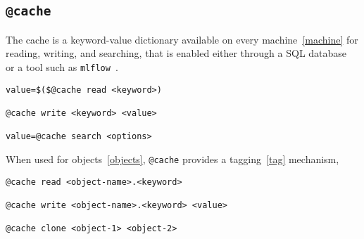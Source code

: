\subsection{\texttt{@cache}}
\label{cache}

The cache is a keyword-value dictionary available on every machine~\ref{machine} for reading, writing, and searching, that is enabled either through a SQL database~ or a tool such as \texttt{mlflow}~.
%
\begin{verbatim}
value=$($@cache read <keyword>)

@cache write <keyword> <value>

value=@cache search <options>
\end{verbatim}
%
When used for objects~\ref{objects}, \texttt{@cache} provides a tagging~\ref{tag} mechanism,
%
\begin{verbatim}
@cache read <object-name>.<keyword>

@cache write <object-name>.<keyword> <value>

@cache clone <object-1> <object-2>
\end{verbatim}